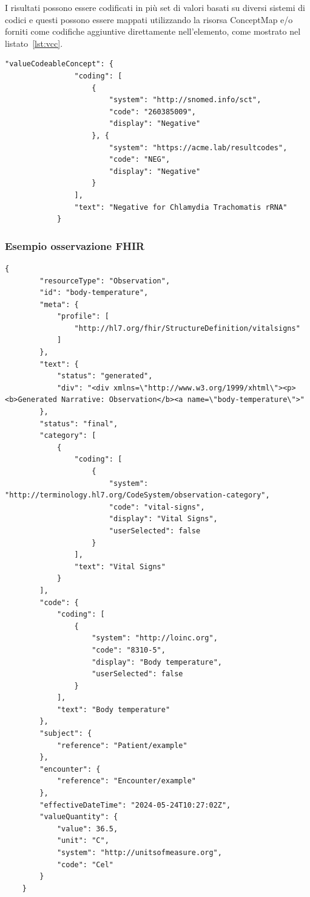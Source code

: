 \documentclass[a4paper]{article}
\begin{document}
I risultati possono essere codificati in più set di valori basati su diversi sistemi di codici e questi possono essere mappati utilizzando la risorsa ConceptMap e/o forniti come codifiche aggiuntive direttamente nell'elemento, come mostrato nel listato~\ref{lst:vcc}.
\begin{lstlisting}[caption={Esempio risorsa ConceptMap}, label={lst:vcc}]
            "valueCodeableConcept": {
                "coding": [
                    {
                        "system": "http://snomed.info/sct",
                        "code": "260385009",
                        "display": "Negative"
                    }, {
                        "system": "https://acme.lab/resultcodes",
                        "code": "NEG",
                        "display": "Negative"
                    }
                ],
                "text": "Negative for Chlamydia Trachomatis rRNA"
            }
        \end{lstlisting}
\subsubsection{Esempio osservazione FHIR}
\begin{lstlisting}[caption={Esempio osservazione FHIR}]
    {
        "resourceType": "Observation",
        "id": "body-temperature",
        "meta": {
            "profile": [
                "http://hl7.org/fhir/StructureDefinition/vitalsigns"
            ]
        },
        "text": {
            "status": "generated",
            "div": "<div xmlns=\"http://www.w3.org/1999/xhtml\"><p><b>Generated Narrative: Observation</b><a name=\"body-temperature\">"
        },
        "status": "final",
        "category": [
            {
                "coding": [
                    {
                        "system": "http://terminology.hl7.org/CodeSystem/observation-category",
                        "code": "vital-signs",
                        "display": "Vital Signs",
                        "userSelected": false
                    }
                ],
                "text": "Vital Signs"
            }
        ],
        "code": {
            "coding": [
                {
                    "system": "http://loinc.org",
                    "code": "8310-5",
                    "display": "Body temperature",
                    "userSelected": false
                }
            ],
            "text": "Body temperature"
        },
        "subject": {
            "reference": "Patient/example"
        },
        "encounter": {
            "reference": "Encounter/example"
        },
        "effectiveDateTime": "2024-05-24T10:27:02Z",
        "valueQuantity": {
            "value": 36.5,
            "unit": "C",
            "system": "http://unitsofmeasure.org",
            "code": "Cel"
        }
    }  

\end{lstlisting}
\end{document}
